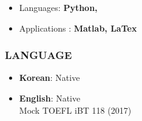 \documentclass[10pt,a4]{article}
\begin{document}
\begin{small}
\begin{itemize}
	\item Languages: \textbf{Python,
	}
	\item Applications : \textbf{Matlab,
	 LaTex}
\end{itemize}

\subsubsection*{LANGUAGE}

\begin{itemize}{}{}
	\item \textbf{Korean}: Native
	\item \textbf{English}: Native \\
	Mock TOEFL iBT 118 (2017)
	
\end{itemize}

\vspace{0.1cm}

%
%
%
%
%
%
%
%
%



\end{small}
\end{document}
